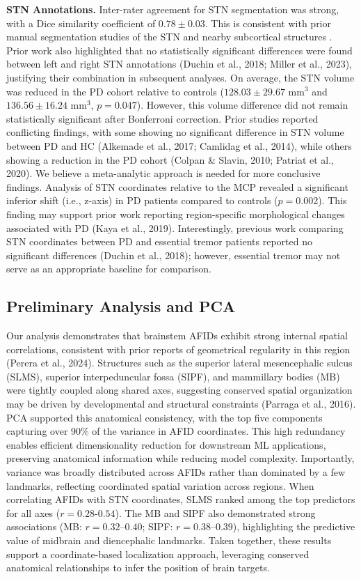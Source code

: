 \newpage
\textbf{STN Annotations.} Inter-rater agreement for STN segmentation was strong, with a Dice similarity coefficient of \( 0.78 \pm 0.03 \). This is consistent with prior manual segmentation studies of the STN and nearby subcortical structures \cite{Camlidag2014-za,Miller2023-ct}. Prior work also highlighted that no statistically significant differences were found between left and right STN annotations (Duchin et al., 2018; Miller et al., 2023), justifying their combination in subsequent analyses. On average, the STN volume was reduced in the PD cohort relative to controls (\( 128.03 \pm 29.67 \text{ mm}^3 \) and \( 136.56 \pm 16.24 \text{ mm}^3 \), \( p = 0.047 \)). However, this volume difference did not remain statistically significant after Bonferroni correction. Prior studies reported conflicting findings, with some showing no significant difference in STN volume between PD and HC (Alkemade et al., 2017; Camlidag et al., 2014), while others showing a reduction in the PD cohort (Colpan \& Slavin, 2010; Patriat et al., 2020). We believe a meta-analytic approach is needed for more conclusive findings. Analysis of STN coordinates relative to the MCP revealed a significant inferior shift (i.e., z-axis) in PD patients compared to controls (\( p = 0.002 \)). This finding may support prior work reporting region-specific morphological changes associated with PD (Kaya et al., 2019). Interestingly, previous work comparing STN coordinates between PD and essential tremor patients reported no significant differences (Duchin et al., 2018); however, essential tremor may not serve as an appropriate baseline for comparison.

\subsection{Preliminary Analysis and PCA}
Our analysis demonstrates that brainstem AFIDs exhibit strong internal spatial correlations, consistent with prior reports of geometrical regularity in this region (Perera et al., 2024). Structures such as the superior lateral mesencephalic sulcus (SLMS), superior interpeduncular fossa (SIPF), and mammillary bodies (MB) were tightly coupled along shared axes, suggesting conserved spatial organization may be driven by developmental and structural constraints (Parraga et al., 2016). PCA supported this anatomical consistency, with the top five components capturing over 90\% of the variance in AFID coordinates. This high redundancy enables efficient dimensionality reduction for downstream ML applications, preserving anatomical information while reducing model complexity. Importantly, variance was broadly distributed across AFIDs rather than dominated by a few landmarks, reflecting coordinated spatial variation across regions. When correlating AFIDs with STN coordinates, SLMS ranked among the top predictors for all axes (\( r = 0.28\text{-}0.54 \)). The MB and SIPF also demonstrated strong associations (MB: \( r = 0.32\text{--}0.40 \); SIPF: \( r = 0.38\text{--}0.39 \)), highlighting the predictive value of midbrain and diencephalic landmarks. Taken together, these results support a coordinate-based localization approach, leveraging conserved anatomical relationships to infer the position of brain targets.

